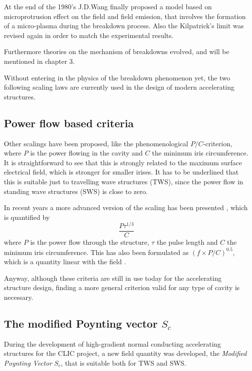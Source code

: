 At the end of the 1980's J.D.Wang finally proposed a model based on microprotrusion effect on the field and field emission, that involves the formation of a micro-plasma during the breakdown process. Also the Kilpatrick's limit was revised again in order to match the experimental results. \cite{Wang:1986, kilp:story}

Furthermore theories on the mechanism of breakdowns evolved, and will be mentioned in chapter 3.

Without entering in the physics of the breakdown phenomenon yet, the two following scaling laws are currently used in the design of modern accelerating structures.

\subsection[Power flow based criteria]{Power flow based criteria}

Other scalings have been proposed, like the phenomenological $P/C$-criterion, where $P$ is the power flowing in the cavity and $C$ the minimum iris circumference. It is straightforward to see that this is strongly related to the maximum surface electrical field, which is stronger for smaller irises. It has to be underlined that this is suitable just to travelling wave structures (TWS), since the power flow in standing wave structures (SWS) is close to zero. 

In recent years a more advanced version of the scaling has been presented \cite{Wuensch:932674}, which is quantified by
\begin{equation}
\frac{P \tau^{1/3}}{C}
\end{equation}
where $P$ is the power flow through the structure, $\tau$ the pulse length and $C$ the minimum iris circumference. This has also been formulated as $(f \times P/C )^{0.5}$, which is a quantity linear with the field \cite{Wuensch:1004189}.

Anyway, although these criteria are still in use today for the accelerating structure design, finding a more general criterion valid for any type of cavity is necessary.

\subsection{The modified Poynting vector $S_c$}

During the development of high-gradient normal conducting accelerating structures for the CLIC project, a new field quantity was developed, the \textit{Modified Poynting Vector} $S_c$, that is suitable both for TWS and SWS. \cite{Grudiev:newLoc}


